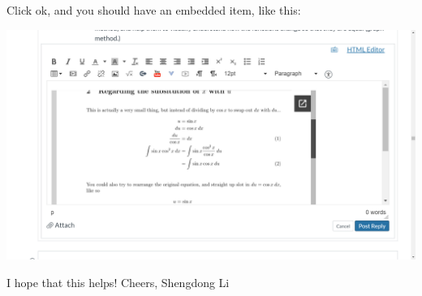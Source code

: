 \documentclass[letterpaper, 12pt]{article}
\begin{document}
Click ok, and you should have an embedded item, like this:
\begin{center}
    \includegraphics[scale=0.3]{8.png}
\end{center}
I hope that this helps! \bigbreak
Cheers, Shengdong Li
\end{document}
